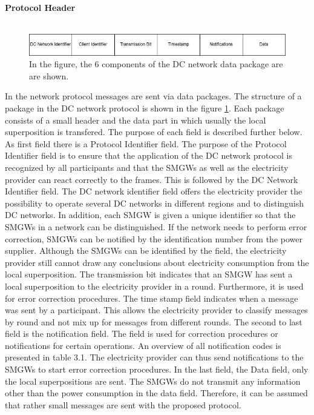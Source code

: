 \\
\textbf{Protocol Header}
\\
\\\begin{figure}[tbp]
  \centering
  \includegraphics[width=1\textwidth]{images/Header.png}
  \caption[DC Network Frame]{
In the figure, the 6 components of the DC network data package are
are shown.}
  \label{fig:frame}
\end{figure}In the network protocol messages are sent via data packages. The structure of a package in the DC network protocol is shown in the figure \ref{fig:frame}. Each package consists of a small header and the data part in which usually the local superposition is transfered. The purpose of each field is described further below.\\
As first field there is a Protocol Identifier field. The purpose of the Protocol Identifier field is to ensure that the application of the DC network protocol is recognized by all participants and that the SMGWs as well as the electricity provider can react correctly to the frames. This is followed by the DC Network Identifier field.%
The DC network identifier field offers the electricity provider the possibility to operate several DC networks in different regions and to distinguish DC networks. In addition, each SMGW is given a unique identifier so that the SMGWs in a network can be distinguished. If the network needs to perform error correction, SMGWs can be notified by the identification number from the power supplier. Although the SMGWs can be identified by the field, the electricity provider still cannot draw any conclusions about electricity consumption from the local superposition. The transmission bit indicates that an SMGW has sent a local superposition to the electricity provider in a round. Furthermore, it is used for error correction procedures. The time stamp field indicates when a message was sent by a participant. This allows the electricity provider to classify messages by round and not mix up for messages from different rounds. The second to last field is the notification field. The field is used for correction procedures or notifications for certain operations. An overview of all notification codes is presented in table 3.1. The electricity provider can thus send notifications to the SMGWs to start error correction procedures. In the last field, the Data field, only the local superpositions are sent. The SMGWs do not transmit any information other than the power consumption in the data field. Therefore, it can be assumed that rather small messages are sent with the proposed protocol.\\
